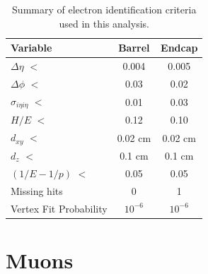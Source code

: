  \begin{table}[h]
\centering
  \caption{Summary of electron identification criteria used in this analysis.}
  \label{tab:eleID}
  \begin{tabular}{ l  c c}
      \hline
      \hline
      	Variable & Barrel & Endcap \\
      	\hline
    		$\Delta\eta$ $<$ &  0.004 & 0.005 \\
     	$\Delta\phi$ $<$ &  0.03 & 0.02 \\
     	$\sigma_{i\eta i\eta}$ $<$ & 0.01 & 0.03 \\
		$H/E$ $<$ & 0.12 & 0.10 \\
		$d_{xy}$ $<$ & 0.02 cm & 0.02 cm \\
		$d_{z}$ $<$  & 0.1 cm & 0.1 cm \\
		$(1/E - 1/p)$ $<$ & 0.05 & 0.05\\
		Missing hits  & 0 & 1 \\
		Vertex Fit Probability & $10^{-6}$ & $10^{-6}$ \\    	

      \hline
      \hline 
  \end{tabular}
\end{table}



\section{Muons}

